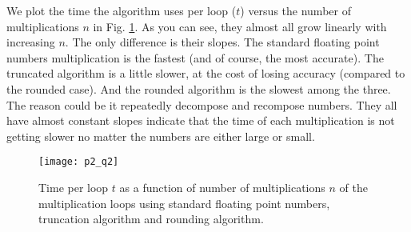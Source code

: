 \Answer We plot the time the algorithm uses per loop ($t$) versus the number of
multiplications $n$ in Fig. \ref{fig:time_loop}. As you can see,
they almost all grow linearly with increasing $n$. The only difference is their slopes.
The standard floating point numbers multiplication is the fastest (and of course, the most
accurate). The truncated algorithm is a little slower, at the cost of losing
accuracy (compared to the rounded case). And the rounded algorithm is the slowest
among the three. The reason could be it repeatedly decompose and recompose numbers.
They all have almost constant slopes indicate that the time of each multiplication
is not getting slower no matter the numbers are either large or small.

\begin{figure}[H]
    \centering
    \texttt{[image: p2\_q2]}
    \caption{Time per loop $t$ as a function of number of multiplications $n$ of
        the multiplication loops using standard floating point numbers,
        truncation algorithm and rounding algorithm.}
    \label{fig:time_loop}
\end{figure}

\newpage
